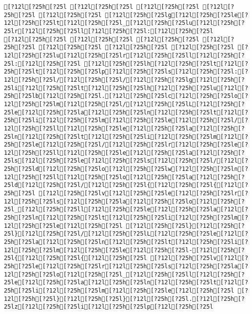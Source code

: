 \documentclass{scrartcl}
\begin{document}
\begin{Verbatim}
[?12l[?25h[?25l [?12l[?25h[?25l [?12l[?25h[?25l [?12l[?25h[?25l [?12l[?25h[?25l [?12l[?25h[?25lg[?12l[?25h[?25le[?12l[?25h[?25lt[?12l[?25h[?25l_[?12l[?25h[?25lu[?12l[?25h[?25lr[?12l[?25h[?25ll[?12l[?25h[?25l:[?12l[?25h[?25l
[?12l[?25h[?25l [?12l[?25h[?25l [?12l[?25h[?25l [?12l[?25h[?25l [?12l[?25h[?25l [?12l[?25h[?25l [?12l[?25h[?25l [?12l[?25h[?25lu[?12l[?25h[?25lr[?12l[?25h[?25ll[?12l[?25h[?25l:[?12l[?25h[?25l [?12l[?25h[?25lh[?12l[?25h[?25lt[?12l[?25h[?25lt[?12l[?25h[?25lp[?12l[?25h[?25ls[?12l[?25h[?25l:[?12l[?25h[?25l/[?12l[?25h[?25l/[?12l[?25h[?25lg[?12l[?25h[?25li[?12l[?25h[?25lt[?12l[?25h[?25lh[?12l[?25h[?25lu[?12l[?25h[?25lb[?12l[?25h[?25l.[?12l[?25h[?25lc[?12l[?25h[?25lo[?12l[?25h[?25lm[?12l[?25h[?25l/[?12l[?25h[?25lL[?12l[?25h[?25le[?12l[?25h[?25la[?12l[?25h[?25ln[?12l[?25h[?25lt[?12l[?25h[?25li[?12l[?25h[?25lm[?12l[?25h[?25le[?12l[?25h[?25l/[?12l[?25h[?25ll[?12l[?25h[?25le[?12l[?25h[?25la[?12l[?25h[?25ln[?12l[?25h[?25lt[?12l[?25h[?25li[?12l[?25h[?25lm[?12l[?25h[?25le[?12l[?25h[?25l/[?12l[?25h[?25lr[?12l[?25h[?25le[?12l[?25h[?25ll[?12l[?25h[?25le[?12l[?25h[?25la[?12l[?25h[?25ls[?12l[?25h[?25le[?12l[?25h[?25ls[?12l[?25h[?25l/[?12l[?25h[?25ld[?12l[?25h[?25lo[?12l[?25h[?25lw[?12l[?25h[?25ln[?12l[?25h[?25ll[?12l[?25h[?25lo[?12l[?25h[?25la[?12l[?25h[?25ld[?12l[?25h[?25l/[?12l[?25h[?25l{[?12l[?25h[?25l{[?12l[?25h[?25l [?12l[?25h[?25lv[?12l[?25h[?25le[?12l[?25h[?25lr[?12l[?25h[?25ls[?12l[?25h[?25la[?12l[?25h[?25lo[?12l[?25h[?25l_[?12l[?25h[?25ll[?12l[?25h[?25le[?12l[?25h[?25la[?12l[?25h[?25ln[?12l[?25h[?25lt[?12l[?25h[?25li[?12l[?25h[?25lm[?12l[?25h[?25le[?12l[?25h[?25l [?12l[?25h[?25l}[?12l[?25h[?25l}[?12l[?25h[?25l/[?12l[?25h[?25lL[?12l[?25h[?25le[?12l[?25h[?25la[?12l[?25h[?25ln[?12l[?25h[?25lt[?12l[?25h[?25li[?12l[?25h[?25lm[?12l[?25h[?25le[?12l[?25h[?25l-[?12l[?25h[?25l{[?12l[?25h[?25l{[?12l[?25h[?25l [?12l[?25h[?25lv[?12l[?25h[?25le[?12l[?25h[?25lr[?12l[?25h[?25ls[?12l[?25h[?25la[?12l[?25h[?25lo[?12l[?25h[?25l_[?12l[?25h[?25ll[?12l[?25h[?25le[?12l[?25h[?25la[?12l[?25h[?25ln[?12l[?25h[?25lt[?12l[?25h[?25li[?12l[?25h[?25lm[?12l[?25h[?25le[?12l[?25h[?25l [?12l[?25h[?25l}[?12l[?25h[?25l}[?12l[?25h[?25l.[?12l[?25h[?25lz[?12l[?25h[?25li[?12l[?25h[?25lp[?12l[?25h[?25l

\end{Verbatim}
\end{document}
